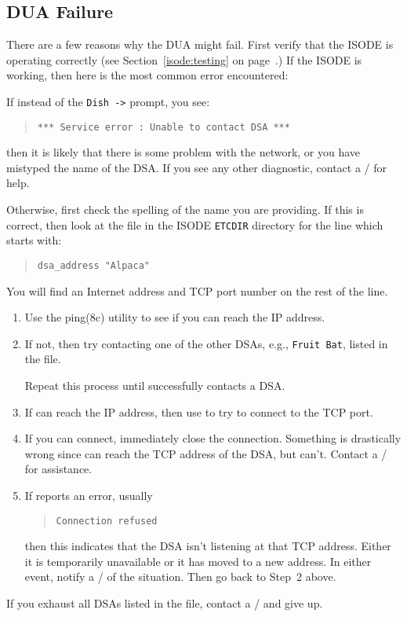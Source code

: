 \subsection	{DUA Failure}\label{dua:failure}
There are a few reasons why the DUA might fail.
First verify that the ISODE is operating correctly
(see Section~\ref{isode:testing} on page~\pageref{isode:testing}.)
If the ISODE is working,
then here is the most common error encountered:

If instead of the \verb"Dish ->" prompt,
you see:
\begin{quote}\small\begin{verbatim}
*** Service error : Unable to contact DSA ***
\end{verbatim}\end{quote}
then it is likely that there is some problem with the network,
or you have mistyped the name of the DSA.
If you see any other diagnostic,
contact a \camayoc/ for help.

Otherwise,
first check the spelling of the name you are providing.
If this is correct,
then look at the file  in the ISODE \verb"ETCDIR" directory
for the line which starts with:
\begin{quote}\small\begin{verbatim}
dsa_address "Alpaca"
\end{verbatim}\end{quote}
You will find an Internet address and TCP port number on the rest of
the line.
\begin{enumerate}
\item	Use the \man ping(8c) utility to see if you can reach the IP address.

\item	If not,
	then try contacting one of the other DSAs,
	e.g., \verb"Fruit Bat",
	listed in the  file.
	
	Repeat this process until  successfully contacts a DSA.

\item	If  can reach the IP address,
	then use  to try to connect to the TCP port.

\item	If you can connect,
	immediately close the connection.
	Something is drastically wrong since  can reach the TCP
	address of the DSA,
	but  can't.
	Contact a \camayoc/ for assistance.

\item	If  reports an error,
	usually
\begin{quote}\small\begin{verbatim}
Connection refused
\end{verbatim}\end{quote}
	then this indicates that the DSA isn't listening at that TCP
	address.
	Either it is temporarily unavailable or it has moved to a new
	address.
	In either event,
	notify a \camayoc/ of the situation.
	Then go back to Step~2 above.
\end{enumerate}
If you exhaust all DSAs listed in the  file,
contact a \camayoc/ and give up.

